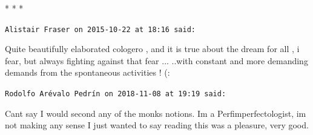 
\begin{center}* * *\end{center}

\begin{footnotesize}
\begin{sffamily}
\texttt{Alistair Fraser on 2015-10-22 at 18:16 said:}

Quite beautifully elaborated cologero , and it is true about the dream for all , i fear, but always fighting against that fear ... ..with constant and more demanding demands from the spontaneous activities ! (:

\hfill

\texttt{Rodolfo Arévalo Pedrín on 2018-11-08 at 19:19 said:}

Cant say I would second any of the monks notions. Im a Perfimperfectologist, im not making any sense I just wanted to say reading this was a pleasure, very good.


\hfill

\end{sffamily}
\end{footnotesize}

